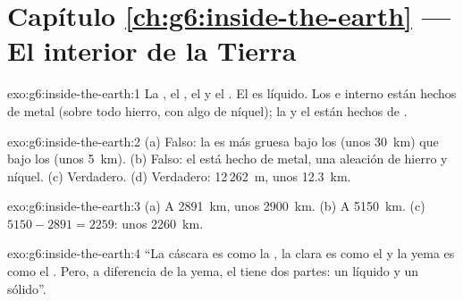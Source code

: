 \section*{Capítulo \ref{ch:g6:inside-the-earth} --- El interior de la Tierra}

\begin{solution}{exo:g6:inside-the-earth:1}
La , el , el  y el . El  es líquido. Los  e interno están hechos de metal
(sobre todo hierro, con algo de níquel); la  y el  están hechos
de .
\end{solution}

\begin{solution}{exo:g6:inside-the-earth:2}
(a) Falso: la  es más gruesa bajo los  (unos 30~km) que
bajo los  (unos 5~km). (b) Falso: el  está hecho de metal, una
aleación de hierro y níquel. (c) Verdadero. (d) Verdadero: 12\,262~m, unos
12.3~km.
\end{solution}

\begin{solution}{exo:g6:inside-the-earth:3}
(a) A 2891~km, unos 2900~km. (b) A 5150~km. (c) $5150 - 2891 = 2259$:
unos 2260~km.
\end{solution}

\begin{solution}{exo:g6:inside-the-earth:4}
``La cáscara es como la \underline{}, la clara es como el
\underline{} y la yema es como el \underline{}. Pero, a
diferencia de la yema, el \underline{} tiene dos partes: un
\underline{} líquido y un \underline{}
sólido''.
\end{solution}


